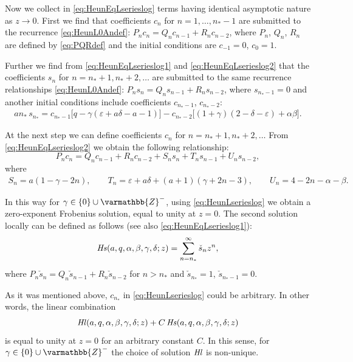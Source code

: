 \documentclass[11pt]{article}
\newcommand{\MF}[1]{\mathop{#1}\nolimits}
\newcommand{\Zz}{\varmathbb{Z}}%
\def\HeunL{\MF{\textit{Hl\/}}}%
\def\HeunS{\MF{\textit{Hs\/}}}%
\def\nsp{n_*}%
\begin{document}
Now we collect in \eqref{eq:HeunEqLserieslog} terms having identical asymptotic
nature as $z\to0$. First we find that coefficients $c_n$ for $n=1,\ldots,\nsp-1$
are submitted to the recurrence \eqref{eq:HeunL0Andef}: $P_n c_n=Q_n c_{n-1}+R_n
c_{n-2}$, where $P_n$, $Q_n$, $R_n$ are defined by \eqref{eq:PQRdef} and the
initial conditions are $c_{-1}=0$, $c_0=1$.

Further we find from \eqref{eq:HeunEqLserieslog1} and
\eqref{eq:HeunEqLserieslog2} that the coefficients $s_n$ for
$n=\nsp+1,\nsp+2,\ldots$ are submitted to the same recurrence relationships
\eqref{eq:HeunL0Andef}: $P_n s_n=Q_n s_{n-1}+R_n s_{n-2}$, where $s_{\nsp-1}=0$
and another initial conditions include coefficients $c_{\nsp-1}$, $c_{\nsp-2}$:
\begin{gather*}
a\nsp\, s_{\nsp}=c_{\nsp-1}\bigl[q-\gamma(\varepsilon+a\delta-a-1)\bigr]-
c_{\nsp-2}\bigl[(1+\gamma)(2-\delta-\varepsilon)+\alpha\beta\bigr].
\end{gather*}

At the next step we can define coefficients $c_n$ for $n=\nsp+1,\nsp+2,\ldots$
From \eqref{eq:HeunEqLserieslog2} we obtain the following relationship:
\begin{equation}
P_n c_n=Q_n c_{n-1}+R_n c_{n-2}+ S_n s_{n}+T_n s_{n-1}+U_n s_{n-2},
\label{eq:recurrlog}
\end{equation}
where
\begin{gather*}
S_n = a(1-\gamma-2n),\qquad
T_n = \varepsilon+a\delta+(a+1)(\gamma+2n-3),\qquad
U_n = 4-2n-\alpha-\beta.
\end{gather*}

In this way for $\gamma\in\{0\}\cup\Zz^-$, using \eqref{eq:HeunLserieslog}  we
obtain a zero-exponent Frobenius solution, equal to unity at $z=0$. The second
solution locally can be defined as follows (see also
\eqref{eq:HeunEqLserieslog1}):
\begin{equation}
  \HeunS(a,q,\alpha,\beta,\gamma,\delta;z)=\sum_{n=\nsp}^{\infty}\check{s}_n z^n,
\label{eq:HeunSsergammanonpositive}
\end{equation}
where $P_n \check{s}_n=Q_n \check{s}_{n-1}+R_n \check{s}_{n-2}$ for $n>\nsp$ and
$\check{s}_{\nsp}=1$, $\check{s}_{\nsp-1}=0$. 

As it was mentioned above, $c_{\nsp}$ in \eqref{eq:HeunLserieslog} could be arbitrary. In other
words, the linear combination
\[
  \HeunL(a,q,\alpha,\beta,\gamma,\delta;z)+C\HeunS(a,q,\alpha,\beta,\gamma,\delta;z)
\]
is equal to unity at $z=0$ for an arbitrary constant $C$. In this sense, for
$\gamma\in\{0\}\cup\Zz^-$ the choice of solution $\HeunL$ is non-unique.
\end{document}
